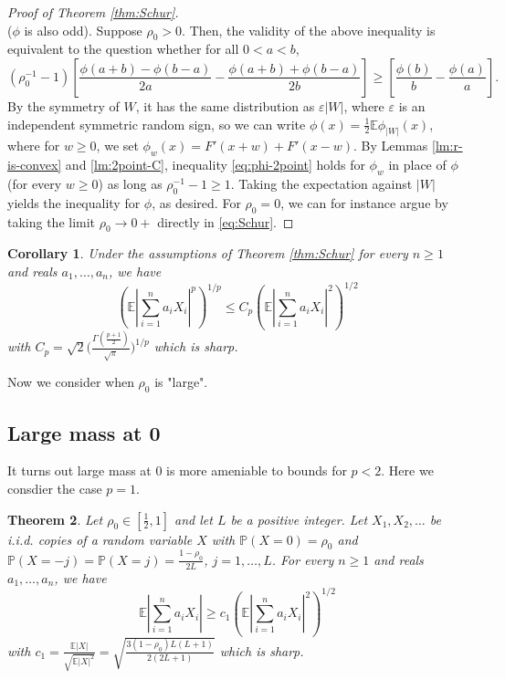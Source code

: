 \documentclass[10pt]{article}
\newcommand{\E}{\mathbb{E}}
\newcommand{\1}{\textbf{1}}
\newcommand{\p}[1]{\mathbb{P}\left( #1 \right)}
\newtheorem{theorem}{Theorem}
\newtheorem{corollary}[theorem]{Corollary}
\theoremstyle{remark}
\theoremstyle{definition}
\begin{document}
\begin{proof}[Proof of Theorem \ref{thm:Schur}]
\[\]
($\phi$ is also odd). Suppose $\rho_0 > 0$. Then, the validity of the above inequality is equivalent to the question whether for all $0 < a < b$,
\begin{equation}\label{eq:phi-2point}
(\rho_0^{-1}-1)\left[\frac{\phi(a+b)-\phi(b-a)}{2a} - \frac{\phi(a+b)+\phi(b-a)}{2b}\right] \geq \left[ \frac{\phi(b)}{b}-\frac{\phi(a)}{a}\right].
\end{equation}
By the symmetry of $W$, it has the same distribution as $\varepsilon |W|$, where $\varepsilon$ is an independent symmetric random sign, so we can write $\phi(x) = \frac{1}{2}\E\phi_{|W|}(x)$, where for $w \geq 0$, we set $\phi_w(x) = F'(x+w) + F'(x-w)$. By Lemmas \ref{lm:r-is-convex} and \ref{lm:2point-C}, inequality \eqref{eq:phi-2point} holds for $\phi_w$ in place of $\phi$ (for every $w \geq 0$) as long as $\rho_0^{-1} - 1 \geq 1$. Taking the expectation against $|W|$ yields the inequality for $\phi$, as desired. For $\rho_0 =0$, we can for instance argue by taking the limit $\rho_0 \to 0+$ directly in \eqref{eq:Schur}.
\end{proof}

\begin{corollary}
Under the assumptions of Theorem \ref{thm:Schur} for every $n \geq 1$ and reals $a_1,\ldots,a_n$, we have
\begin{equation}\label{eq:2-p>3'}
\left(\E\left|\sum_{i=1}^n a_iX_i \right|^p\right)^{1/p} \leq C_p \left(\E\left|\sum_{i=1}^n a_iX_i \right|^2\right)^{1/2} 
\end{equation}
with $C_p = \sqrt{2} \Big(\frac{\Gamma (\frac{p+1}{2})}{\sqrt{\pi}} \Big)^{1/p}$ which is sharp.
\end{corollary}

Now we consider when $\rho_0$ is "large".

\subsection{Large mass at 0}

It turns out large mass at 0 is more ameniable to bounds for $p < 2$. Here we consdier the case $p=1$. 

\begin{theorem}\label{thm:L1-L2}
Let $\rho_0 \in [\frac{1}{2},1]$ and let $L$ be a positive integer. Let $X_1,X_2,\ldots$ be i.i.d. copies of a random variable $X$ with $\p{X = 0} = \rho_0$ and $\p{X = -j} = \p{X = j} = \frac{1-\rho_0}{2L}$, $j = 1, \ldots, L$. For every $n \geq 1$ and reals $a_1,\ldots,a_n$, we have
\begin{equation}\label{eq:L1-L2}
\E\left|\sum_{i=1}^n a_iX_i \right| \geq c_1\left(\E\left|\sum_{i=1}^n a_iX_i \right|^2\right)^{1/2} 
\end{equation}
with $c_1 = \frac{\E|X|}{\sqrt{\E|X|^2}} = \sqrt{\frac{3(1-\rho_0)L(L+1)}{2(2L+1)}}$ which is sharp.
\end{theorem}
\end{document}
